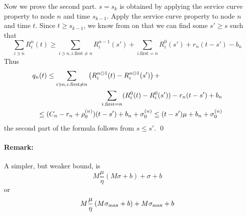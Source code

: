 Now we prove the second part. $s=s_k$ is obtained by applying the
service curve property to node $n$ and time $s_{k-1}$. Apply the
service curve property to node $n$ and time $t$. Since $t \geq
s_{k-1}$, we know from  on
 that we can find some $s' \geq s$ such
that
$$\sum_{i \ni n} R^n_i(t) \geq \sum_{i \ni
n, i.\mathrm{first} \neq n} R^{n-1}_i(s') + \sum_{i.\mathrm{first}
= n} R^0_i(s') + r_n(t-s') - b_n
$$
Thus
\begin{eqnarray*}
\lefteqn{ q_n(t) \leq
  \sum_{i \ni n, i.\mathrm{first} \neq n}
\left(R^{n\ominus 1}_i(t)-R^{n \ominus 1}_i(s')\right) +}
 \\ & &
\sum_{i.\mathrm{first} = n} (R^0_i(t)-R^0_i(s')) - r_n(t-s') + b_n
\\
 & & \leq (C_n-r_n + \rho^{(n)}_0)(t-s') + b_n + \sigma^{(n)}_0
\leq(t-s') \mu  + b_n + \sigma^{(n)}_0
\end{eqnarray*} the second
part of the formula follows from $s \leq s'$. \qed

\paragraph{Remark: }
A simpler, but weaker bound, is
$$M \frac{\mu}{\eta} \left( M \sigma + b \right) + \sigma +b
$$
or
\begin{equation}\mylabel{eq-tg33}
 M \frac{\mu}{\eta} \left( M \sigma_{\max} + b \right) + M \sigma_{\max} +b
\end{equation}
